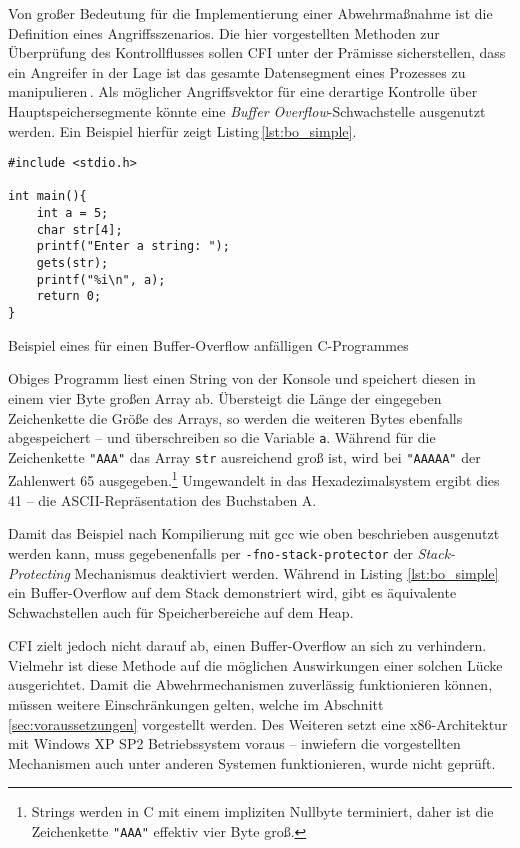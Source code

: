 Von großer Bedeutung für die Implementierung einer Abwehrmaßnahme ist die Definition eines Angriffsszenarios. Die hier vorgestellten Methoden zur Überprüfung des Kontrollflusses sollen CFI unter der Prämisse sicherstellen, dass ein Angreifer in der Lage ist das gesamte Datensegment eines Prozesses zu manipulieren\,\cite{Abadi.2009}. Als möglicher Angriffsvektor für eine derartige Kontrolle über Hauptspeichersegmente könnte eine \emph{Buffer Overflow}-Schwachstelle ausgenutzt werden. Ein Beispiel hierfür zeigt Listing\,\ref{lst:bo_simple}.

\begin{listing}[ht]
\begin{verbatim}
#include <stdio.h>

int main(){
	int a = 5;
	char str[4];
	printf("Enter a string: ");
	gets(str);
	printf("%i\n", a);
	return 0;
}
\end{verbatim}
\caption{Beispiel eines für einen Buffer-Overflow anfälligen C-Programmes}
\label{lst:bo_simple}
\end{listing}

Obiges Programm liest einen String von der Konsole und speichert diesen in einem vier Byte großen Array ab. Übersteigt die Länge der eingegeben Zeichenkette die Größe des Arrays, so werden die weiteren Bytes ebenfalls abgespeichert -- und überschreiben so die Variable \texttt{a}. Während für die Zeichenkette \texttt{"AAA"} das Array \texttt{str} ausreichend groß ist, wird bei \texttt{"AAAAA"} der Zahlenwert 65 ausgegeben.\footnote{Strings werden in C mit einem impliziten Nullbyte terminiert, daher ist die Zeichenkette \texttt{"AAA"} effektiv vier Byte groß.} Umgewandelt in das Hexadezimalsystem ergibt dies 41 -- die ASCII-Repräsentation des Buchstaben A.


Damit das Beispiel nach Kompilierung mit gcc wie oben beschrieben ausgenutzt werden kann, muss gegebenenfalls per \texttt{-fno-stack-protector} der \emph{Stack-Protecting} Mechanismus deaktiviert werden. Während in Listing \ref{lst:bo_simple} ein Buffer-Overflow auf dem Stack demonstriert wird, gibt es äquivalente Schwachstellen auch für Speicherbereiche auf dem Heap.


CFI zielt jedoch nicht darauf ab, einen Buffer-Overflow an sich zu verhindern. Vielmehr ist diese Methode auf die möglichen Auswirkungen einer solchen Lücke ausgerichtet. Damit die Abwehrmechanismen zuverlässig funktionieren können, müssen weitere Einschränkungen gelten, welche im Abschnitt \ref{sec:voraussetzungen} vorgestellt werden. Des Weiteren setzt \cite{Abadi.2009} eine x86-Architektur mit Windows XP SP2 Betriebssystem voraus -- inwiefern die vorgestellten Mechanismen auch unter anderen Systemen funktionieren, wurde nicht geprüft.

